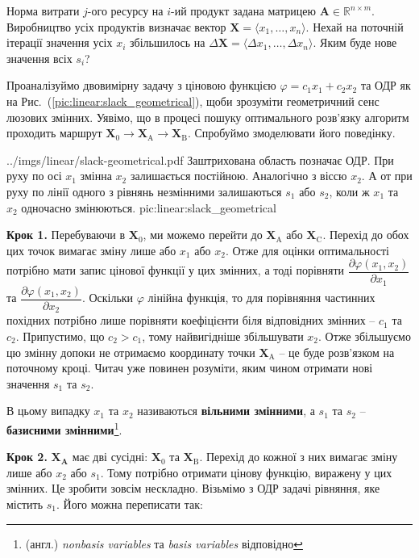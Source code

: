 \documentclass[\main/book.tex]{subfiles}
\begin{document}
\begin{question}
 Норма витрати $j$-ого ресурсу на $i$-ий продукт задана матрицею ${\mathbf{A} \in \mathbb{R}^{n \times m}}$. Виробництво усіх продуктів визначає вектор $\mathbf{X} = \langle x_1, \ldots, x_n \rangle$. Нехай на поточній ітерації значення усіх $x_i$ збільшилось на $\Delta \mathbf{X} = \langle \Delta x_1, \ldots, \Delta x_n \rangle$. Яким буде нове значення всіх $s_i$?
\end{question}

Проаналізуймо двовимірну задачу з ціновою функцією $\varphi = c_1 x_1 + c_2 x_2$ та ОДР як на Рис.~(\ref{pic:linear:slack_geometrical}), щоби зрозуміти геометричний сенс люзових змінних. Уявімо, що в процесі пошуку оптимального розв'язку алгоритм проходить маршрут $\mathbf{X}_0 \rightarrow \mathbf{X}_\mathrm{A} \rightarrow \mathbf{X}_\mathrm{B}$. Спробуймо змоделювати його поведінку.

\illustration
 {../imgs/linear/slack-geometrical.pdf}
 {Заштрихована область позначає ОДР. При руху по осі $x_1$ змінна $x_2$ залишається постійною. Аналогічно з віссю $x_2$. А от при руху по лінії одного з рівнянь незмінними залишаються $s_1$ або $s_2$, коли ж $x_1$ та $x_2$ одночасно змінюються.}
 {pic:linear:slack_geometrical}

\textbf{Крок 1.} \quad Перебуваючи в $\mathbf{X}_0$, ми можемо перейти до $\mathbf{X}_\mathrm{A}$ або $\mathbf{X}_\mathrm{C}$. Перехід до обох цих точок вимагає зміну лише або $x_1$ або $x_2$. Отже для оцінки оптимальності потрібно мати запис цінової функції у цих змінних, а тоді порівняти $\dfrac{\partial \varphi(x_1, x_2)}{\partial x_1}$ та $\dfrac{\partial \varphi(x_1, x_2)}{\partial x_2}$. Оскільки $\varphi$ лінійна функція, то для порівняння частинних похідних потрібно лише порівняти коефіцієнти біля відповідних змінних -- $c_1$ та $c_2$. Припустимо, що $c_2 > c_1$, тому найвигідніше збільшувати $x_2$. Отже збільшуємо цю змінну допоки не отримаємо координату точки $\mathbf{X}_\mathrm{A}$ -- це буде розв'язком на поточному кроці. Читач уже повинен розуміти, яким чином отримати нові значення $s_1$ та $s_2$.

В цьому випадку $x_1$ та $x_2$ називаються \textbf{вільними змінними}, а $s_1$ та $s_2$ -- \textbf{базисними змінними}\footnote{(англ.) \textit{nonbasis variables} та \textit{basis variables} відповідно}.

\textbf{Крок 2.}  $\mathbf{X}_\mathbf{A}$ має дві сусідні: $\mathbf{X}_0$ та $\mathbf{X}_\mathrm{B}$. Перехід до кожної з них вимагає зміну лише або $x_2$ або $s_1$. Тому потрібно отримати цінову функцію, виражену у цих змінних. Це зробити зовсім нескладно. Візьмімо з ОДР задачі рівняння, яке містить $s_1$. Його можна переписати так:
 
\end{document}
